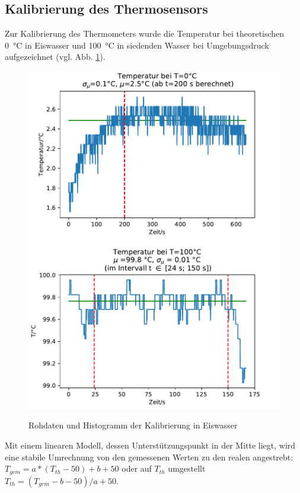 \documentclass[]{article}
\begin{document}
\subsection{Kalibrierung des Thermosensors}
Zur Kalibrierung des Thermometers wurde die Temperatur bei theoretischen \SI{0}{\celsius} in Eiswasser und \SI{100}{\celsius} in siedenden Wasser bei Umgebungsdruck aufgezeichnet (vgl. Abb. \ref{K_Roh}).
\begin{figure}
	\begin{center}
		\includegraphics[scale=0.45]{Images/Kalib_T_0.pdf}
		\includegraphics[scale=0.45]{Images/Kalib_T_100.pdf}
		\caption{Rohdaten und Histogramm der Kalibrierung in Eiswasser}
		\label{K_Roh}
	\end{center}
\end{figure}
Mit einem linearen Modell, dessen Unterstützungspunkt in der Mitte liegt, wird eine stabile Umrechnung von den gemessenen Werten zu den realen angestrebt: $T_{gem} = a*(T_{th}-50) + b + 50$ oder auf $T_{th}$ umgestellt $T_{th} = (T_{gem}-b-50)/a + 50$. \\
\end{document}
